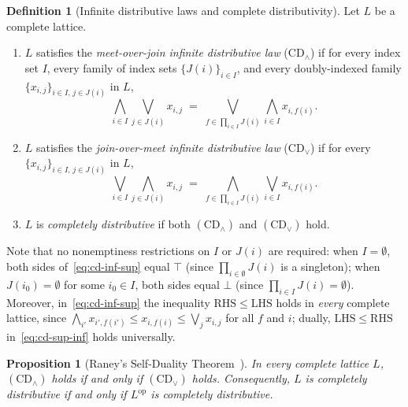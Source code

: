 \documentclass[11pt,a4paper]{article}
\theoremstyle{plain}
\newtheorem{proposition}[theorem]{Proposition}
\theoremstyle{definition}
\newtheorem{definition}[theorem]{Definition}
\newcommand{\CDinf}{\mathrm{CD}_{\wedge}}
\newcommand{\CDsup}{\mathrm{CD}_{\vee}}
\newcommand{\op}{\mathrm{op}}
\begin{document}
\begin{definition}[Infinite distributive laws and complete distributivity]
\label{def:cd}
Let $L$ be a complete lattice.
\begin{enumerate}
  \item $L$ satisfies the \emph{meet-over-join infinite distributive law} ($\CDinf$) if
    for every index set $I$, every family of index sets $\{J(i)\}_{i \in I}$, and every
    doubly-indexed family $\{x_{i,j}\}_{i \in I,\, j \in J(i)}$ in $L$,
    \begin{equation}
      \label{eq:cd-inf-sup}
      \bigwedge_{i \in I} \bigvee_{j \in J(i)} x_{i,j}
      \;=\;
      \bigvee_{f \in \prod_{i \in I} J(i)} \bigwedge_{i \in I} x_{i, f(i)}.
    \end{equation}
  \item $L$ satisfies the \emph{join-over-meet infinite distributive law} ($\CDsup$) if
    for every $\{x_{i,j}\}_{i \in I,\, j \in J(i)}$ in $L$,
    \begin{equation}
      \label{eq:cd-sup-inf}
      \bigvee_{i \in I} \bigwedge_{j \in J(i)} x_{i,j}
      \;=\;
      \bigwedge_{f \in \prod_{i \in I} J(i)} \bigvee_{i \in I} x_{i, f(i)}.
    \end{equation}
  \item $L$ is \emph{completely distributive} if both $(\CDinf)$ and $(\CDsup)$ hold.
\end{enumerate}
\end{definition}

Note that no nonemptiness restrictions on $I$ or $J(i)$ are required: when $I = \emptyset$,
both sides of~\eqref{eq:cd-inf-sup} equal $\top$ (since $\prod_{i \in \emptyset} J(i)$ is a
singleton); when $J(i_0) = \emptyset$ for some $i_0 \in I$, both sides equal $\bot$
(since $\prod_{i \in I} J(i) = \emptyset$). Moreover, in~\eqref{eq:cd-inf-sup} the
inequality $\mathrm{RHS} \le \mathrm{LHS}$ holds in \emph{every} complete lattice, since
$\bigwedge_{i'} x_{i', f(i')} \le x_{i, f(i)} \le \bigvee_{j} x_{i,j}$ for all $f$ and $i$;
dually, $\mathrm{LHS} \le \mathrm{RHS}$ in~\eqref{eq:cd-sup-inf} holds universally.

\begin{proposition}[Raney's Self-Duality Theorem~\cite{Raney1952}]
\label{prop:self-duality}
In every complete lattice $L$, $(\CDinf)$ holds if and only if $(\CDsup)$ holds.
Consequently, $L$ is completely distributive if and only if $L^{\op}$ is completely
distributive.
\end{proposition}
\end{document}
